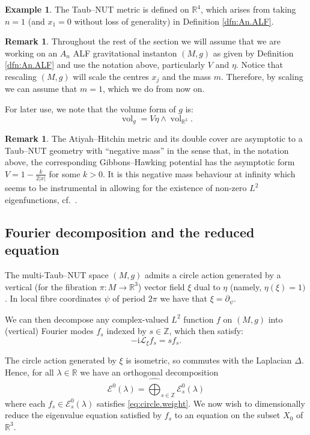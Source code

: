 \documentclass{article}
\theoremstyle{definition}
\newtheorem{rmk}[thm]{Remark}
\newtheorem{eg}[thm]{Example}
\numberwithin{thm}{section}
\numberwithin{equation}{section}
\DeclareMathOperator\vol{vol}
\def\R{\mathbb{R}}
\def\Z{\mathbb{Z}}
\newcommand{\ii}{\mathrm i}
\newcommand{\Lie}{\mathcal L}
\begin{document}
\begin{eg}
The Taub--NUT metric is defined on $\R^4$, which arises from taking $n=1$ (and $x_1=0$ without loss of generality) in Definition \ref{dfn:An.ALF}.
\end{eg}

\begin{rmk}  Throughout the rest of the section we will assume that we are working on an $A_{n}$ ALF gravitational instanton $(M,g)$ as given by Definition \ref{dfn:An.ALF} and use the notation above, particularly $V$ and $\eta$.  Notice that rescaling $(M,g)$ will scale the centres $x_j$ and the mass $m$.  Therefore, by scaling we can assume that  $m=1$, which we do from now on.
\end{rmk}

For later use, we note that the volume form of $g$ is:
\begin{equation}\label{eq:vol.V}
\vol_g=V\eta\wedge\vol_{\R^3}.
\end{equation} 
 

\begin{rmk}
The Atiyah--Hitchin metric and its double cover are asymptotic to a Taub--NUT geometry with ``negative mass'' in the sense that, in the notation above, the corresponding Gibbons--Hawking potential has the asymptotic form $V=1-\frac{k}{2|x|}$ for some $k>0$.  It is this negative mass behaviour at infinity which seems to be instrumental in allowing for the existence of non-zero $L^2$ eigenfunctions, cf.~\cite{Schroers3, GibbonsManton}.
\end{rmk}

\subsection{Fourier decomposition and the reduced equation}

The multi-Taub--NUT space $(M,g)$ admits a circle action  generated by a vertical (for the fibration $\pi:M\to\R^3$) vector field $\xi$ dual to $\eta$ (namely, $\eta(\xi) = 1)$. In local fibre coordinates $\psi$ of period $2\pi$ we have that $\xi=\partial_\psi$. 

We can then decompose any complex-valued $L^2$ function $f$ on $(M,g)$ into (vertical) Fourier modes $f_s$ indexed by $s\in\Z$, which then satisfy:
\begin{equation}\label{eq:circle.weight}
    -\ii\Lie_\xi f_s=sf_s.
\end{equation}

The circle action generated by $\xi$ is isometric, so commutes with the Laplacian $\Delta$.  Hence, for all $\lambda\in\R$ we have an orthogonal decomposition 
\begin{equation}\label{eq:E0s}
    \mathcal{E}^0(\lambda)=\widehat{\bigoplus}_{s\in\Z}\mathcal{E}^0_s(\lambda)
\end{equation}
where each $f_s\in\mathcal{E}^0_s(\lambda)$ satisfies \eqref{eq:circle.weight}.  We now wish to dimensionally reduce the eigenvalue equation satisfied by $f_s$ to an equation on the subset $X_0$ of $\R^3$.
\end{document}
